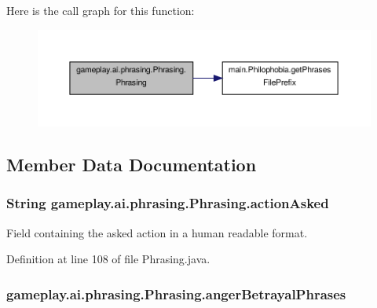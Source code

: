 Here is the call graph for this function\-:
\nopagebreak
\begin{figure}[H]
\begin{center}
\leavevmode
\includegraphics[width=350pt]{a00018_a369fb65d1e9363006fb8f4fa31b438de_cgraph}
\end{center}
\end{figure}




\subsection{Member Data Documentation}
\hypertarget{a00018_a613e36f3cca02a5ff83401e2373effd9}{
\subsubsection[{action\-Asked}]{\setlength{\rightskip}{0pt plus 5cm}String gameplay.\-ai.\-phrasing.\-Phrasing.\-action\-Asked\hspace{0.3cm}{\ttfamily [protected]}}}\label{a00018_a613e36f3cca02a5ff83401e2373effd9}


Field containing the asked action in a human readable format. 



Definition at line 108 of file Phrasing.\-java.

\hypertarget{a00018_a69df7c3975018f12a43f29172bbc5789}{
\subsubsection[{anger\-Betrayal\-Phrases}]{ gameplay.\-ai.\-phrasing.\-Phrasing.\-anger\-Betrayal\-Phrases\hspace{0.3cm}{\ttfamily [protected]}}}\label{a00018_a69df7c3975018f12a43f29172bbc5789}


